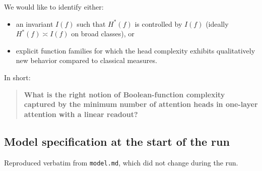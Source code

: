 \documentclass{article}
\theoremstyle{definition}
\theoremstyle{plain}
\begin{document}
\begin{sourcebox}
We would like to identify either:

\begin{itemize}[leftmargin=*,nosep]
  \item an invariant $I(f)$ such that $H^{\ast}(f)$ is controlled by $I(f)$ (ideally $H^{\ast}(f) \asymp I(f)$ on broad classes), or
  \item explicit function families for which the head complexity exhibits qualitatively new behavior compared to classical measures.
\end{itemize}

In short:

\begin{quote}\textbf{What is the right notion of Boolean-function complexity captured by the minimum number of attention heads in one-layer attention with a linear readout?}\end{quote}
\end{sourcebox}

\subsection{Model specification at the start of the run}
\label{app:model-spec}

Reproduced verbatim from \texttt{model.md}, which did not change during the run.
\end{document}
